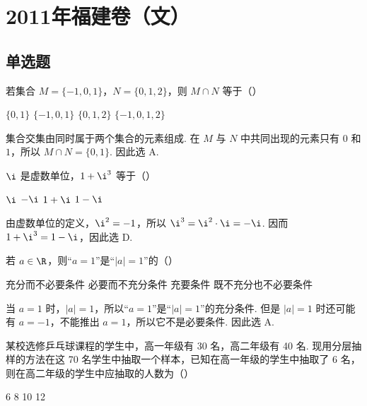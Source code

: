 \chapter{2011年福建卷（文）}

\section{单选题}

\begin{problem}
若集合 \(M = \{-1, 0, 1\}\)，\(N = \{0, 1, 2\}\)，则 \(M \cap N\) 等于（\quad）

\choices
    {\(\{0, 1\}\)}
    {\( \{-1,0,1\} \)}
    {\(\{0,1,2\}\)}
    {\(\{-1,0,1,2\}\)}
\end{problem}


\begin{solution}
集合交集由同时属于两个集合的元素组成. 在 \(M\) 与 \(N\) 中共同出现的元素只有 \(0\) 和 \(1\)，所以 \(M\cap N=\{0,1\}\). 因此选 A.
\end{solution}

\begin{problem}
\(\i\) 是虚数单位，\( 1 + \i^{3} \) 等于（\quad）

\choices
    {\(\i\)}
    {\(-\i\)}
    {\(1 + \i\)}
    {\(1 - \i\)}
\end{problem}


\begin{solution}
由虚数单位的定义，\(\i^2=-1\)，所以 \(\i^3=\i^2\cdot\i=-\i\). 因而 \(1+\i^3=1-\i\)，因此选 D.
\end{solution}

\begin{problem}
若 \(a \in \R\)，则“\(a = 1\)”是“\(\lvert a \rvert = 1\)”的（\quad）

\choices
    {充分而不必要条件}
    {必要而不充分条件}
    {充要条件}
    {既不充分也不必要条件}
\end{problem}


\begin{solution}
当 \(a=1\) 时，\(\lvert a\rvert=1\)，所以“\(a=1\)”是“\(\lvert a\rvert=1\)”的充分条件. 但是 \(\lvert a\rvert=1\) 时还可能有 \(a=-1\)，不能推出 \(a=1\)，所以它不是必要条件. 因此选 A.
\end{solution}

\begin{problem}
某校选修乒乓球课程的学生中，高一年级有 30 名，高二年级有 40 名. 现用分层抽样的方法在这 70 名学生中抽取一个样本，已知在高一年级的学生中抽取了 6 名，则在高二年级的学生中应抽取的人数为（\quad）

\choices
    {6}
    {8}
    {10}
    {12}
\end{problem}

